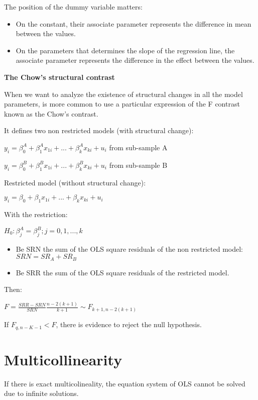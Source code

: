 \documentclass[10pt,landscape]{article}
\begin{document}
\begin{multicols}{3}
The position of the dummy variable matters:
\begin{itemize}[leftmargin=*]
\item On the constant, their associate parameter represents the difference in mean between the values.
\item On the parameters that determines the slope of the regression line, the associate parameter represents the difference in the effect between the values.
\end{itemize}

\textbf{The Chow's structural contrast}

When we want to analyze the existence of structural changes in all the model parameters, is more common to use a particular expression of the F contrast known as the Chow's contrast.

It defines two non restricted models (with structural change):

$y_i = \beta_0^A + \beta_1^A x_{1i} + ... + \beta_k^A x_{ki} + u_i$ from sub-sample A

$y_i = \beta_0^B + \beta_1^B x_{1i} + ... + \beta_k^B x_{ki} + u_i$ from sub-sample B

Restricted model (without structural change):

$y_i = \beta_0 + \beta_1 x_{1i} + ... + \beta_k x_{ki} + u_i$

With the restriction:

$H_0: \beta_j^A = \beta_j^B; j=0,1,...,k$

\begin{itemize}[leftmargin=*]
\item Be SRN the sum of the OLS square residuals of the non restricted model: $SRN = SR_A + SR_B$
\item Be SRR the sum of the OLS square residuals of the restricted model.
\end{itemize}

Then:

$F = \frac{SRR - SRN}{SRN} \frac{n-2(k+1)}{k+1} \sim F_{k+1,n-2(k+1)}$

If $F_{q, n-K-1} < F$, there is evidence to reject the null hypothesis.

\section*{Multicollinearity}

If there is exact multicolineality, the equation system of OLS cannot be solved due to infinite solutions.


\end{multicols}
\end{document}
